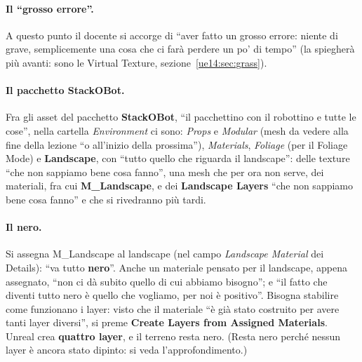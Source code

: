 \paragraph{Il ``grosso errore''.} A questo punto il docente si accorge di ``aver fatto un grosso
errore: niente di grave, semplicemente una cosa che ci farà perdere un po' di tempo'' (la
spiegherà più avanti: sono le Virtual Texture, sezione~\ref{ue14:sec:grass}).

\paragraph{Il pacchetto StackOBot.} Fra gli asset del pacchetto \textbf{StackOBot}, ``il
pacchettino con il robottino e tutte le cose'', nella cartella \emph{Environment} ci sono:
\emph{Props} e \emph{Modular} (mesh da vedere alla fine della lezione ``o all'inizio della
prossima''), \emph{Materials}, \emph{Foliage} (per il Foliage Mode) e \textbf{Landscape}, con
``tutto quello che riguarda il landscape'': delle texture ``che non sappiamo bene cosa
fanno'', una mesh che per ora non serve, dei materiali, fra cui \textbf{M\_Landscape}, e dei
\textbf{Landscape Layers} ``che non sappiamo bene cosa fanno'' e che si rivedranno più
tardi.

\paragraph{Il nero.} Si assegna M\_Landscape al landscape (nel campo \emph{Landscape
Material} dei Details): ``va tutto \textbf{nero}''. Anche un materiale pensato per il
landscape, appena assegnato, ``non ci dà subito quello di cui abbiamo bisogno''; e ``il fatto
che diventi tutto nero è quello che vogliamo, per noi è positivo''. Bisogna stabilire come
funzionano i layer: visto che il materiale ``è già stato costruito per avere tanti layer
diversi'', si preme \textbf{Create Layers from Assigned Materials}. Unreal crea
\textbf{quattro layer}, e il terreno resta nero. (Resta nero perché nessun layer è ancora
stato dipinto: si veda l'approfondimento.)

